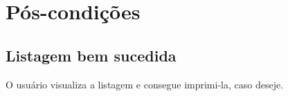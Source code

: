\documentclass[11pt, a4paper,oneside]{book}
\begin{document}
%
%
%
%

\section{Pós-condições}

\subsection{Listagem bem sucedida}

O usuário visualiza a listagem e consegue imprimi-la, caso deseje.

%
\end{document}
